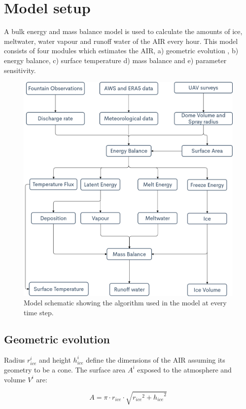 \documentclass[utf8]{frontiersSCNS} %
\begin{document}
\section{Model setup}

A bulk energy and mass balance model is used to calculate the amounts of ice, meltwater, water vapour and runoff water
of the AIR every hour. This model consists of four modules which estimates the AIR, a) geometric evolution , b) energy
balance, c) surface temperature d) mass balance and e) parameter sensitivity.

\begin{figure} \begin{center} \includegraphics[width=12 cm]{Figures/model_schematic.png} \end{center} \caption{Model
		schematic showing the algorithm used in the model at every time step. } \label{fig:schema} \end{figure}

\subsection{Geometric evolution}

Radius $r_{ice}^i$ and height $h_{ice}^i$ define the dimensions of the AIR assuming its geometry to be a cone. The
surface area $A^i$ exposed to the atmosphere and volume $V^i$ are:

\begin{equation} A = \pi \cdot r_{ice} \cdot \sqrt{{r_{ice}}^2 + {h_{ice}}^ 2} \label{eqn:A} \end{equation}
\end{document}
